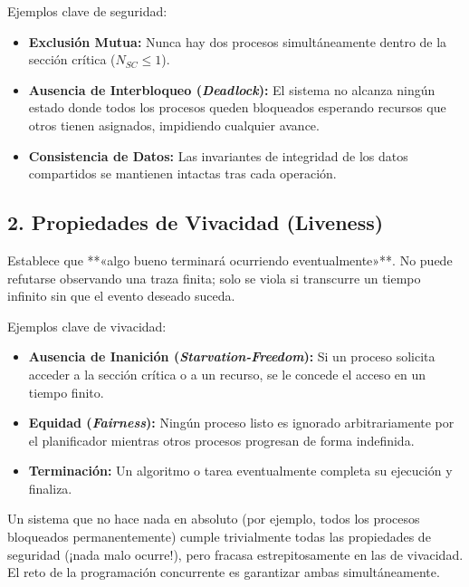 Ejemplos clave de seguridad:
\begin{itemize}
    \item \textbf{Exclusión Mutua:} Nunca hay dos procesos simultáneamente dentro de la sección crítica ($N_{SC} \le 1$).
    \item \textbf{Ausencia de Interbloqueo (\textit{Deadlock}):} El sistema no alcanza ningún estado donde todos los procesos queden bloqueados esperando recursos que otros tienen asignados, impidiendo cualquier avance.
    \item \textbf{Consistencia de Datos:} Las invariantes de integridad de los datos compartidos se mantienen intactas tras cada operación.
\end{itemize}

\subsection{2. Propiedades de Vivacidad (Liveness)}
\begin{definicion}
Establece que **«algo bueno terminará ocurriendo eventualmente»**. No puede refutarse observando una traza finita; solo se viola si transcurre un tiempo infinito sin que el evento deseado suceda.
\end{definicion}

Ejemplos clave de vivacidad:
\begin{itemize}
    \item \textbf{Ausencia de Inanición (\textit{Starvation-Freedom}):} Si un proceso solicita acceder a la sección crítica o a un recurso, se le concede el acceso en un tiempo finito.
    \item \textbf{Equidad (\textit{Fairness}):} Ningún proceso listo es ignorado arbitrariamente por el planificador mientras otros procesos progresan de forma indefinida.
    \item \textbf{Terminación:} Un algoritmo o tarea eventualmente completa su ejecución y finaliza.
\end{itemize}

\begin{aviso}
Un sistema que no hace nada en absoluto (por ejemplo, todos los procesos bloqueados permanentemente) cumple trivialmente todas las propiedades de seguridad (¡nada malo ocurre!), pero fracasa estrepitosamente en las de vivacidad. El reto de la programación concurrente es garantizar ambas simultáneamente.
\end{aviso}

